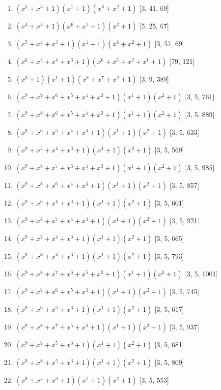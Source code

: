 \documentclass[10pt,twocolumn]{article}
\begin{document}
\begin{enumerate}
\item $(x^{5} + x^{3} + 1)(x^{1} + 1)(x^{6} + x^{2} + 1)$  [3, 41, 69]
\item $(x^{4} + x^{3} + 1)(x^{6} + x^{1} + 1)(x^{2} + 1)$  [5, 25, 67]
\item $(x^{5} + x^{4} + x^{3} + 1)(x^{1} + 1)(x^{6} + x^{2} + 1)$  [3, 57, 69]
\item $(x^{6} + x^{5} + x^{4} + x^{3} + 1)(x^{6} + x^{3} + x^{2} + x^{1} + 1)$  [79, 121]
\item $(x^{3} + 1)(x^{1} + 1)(x^{8} + x^{7} + x^{2} + 1)$  [3, 9, 389]
\item $(x^{9} + x^{7} + x^{6} + x^{5} + x^{4} + x^{3} + 1)(x^{1} + 1)(x^{2} + 1)$  [3, 5, 761]
\item $(x^{9} + x^{8} + x^{6} + x^{5} + x^{4} + x^{3} + 1)(x^{1} + 1)(x^{2} + 1)$  [3, 5, 889]
\item $(x^{9} + x^{6} + x^{5} + x^{4} + x^{3} + 1)(x^{1} + 1)(x^{2} + 1)$  [3, 5, 633]
\item $(x^{9} + x^{5} + x^{4} + x^{3} + 1)(x^{1} + 1)(x^{2} + 1)$  [3, 5, 569]
\item $(x^{9} + x^{8} + x^{7} + x^{6} + x^{4} + x^{3} + 1)(x^{1} + 1)(x^{2} + 1)$  [3, 5, 985]
\item $(x^{9} + x^{8} + x^{6} + x^{4} + x^{3} + 1)(x^{1} + 1)(x^{2} + 1)$  [3, 5, 857]
\item $(x^{9} + x^{6} + x^{4} + x^{3} + 1)(x^{1} + 1)(x^{2} + 1)$  [3, 5, 601]
\item $(x^{9} + x^{8} + x^{7} + x^{4} + x^{3} + 1)(x^{1} + 1)(x^{2} + 1)$  [3, 5, 921]
\item $(x^{9} + x^{7} + x^{4} + x^{3} + 1)(x^{1} + 1)(x^{2} + 1)$  [3, 5, 665]
\item $(x^{9} + x^{8} + x^{4} + x^{3} + 1)(x^{1} + 1)(x^{2} + 1)$  [3, 5, 793]
\item $(x^{9} + x^{8} + x^{7} + x^{6} + x^{5} + x^{3} + 1)(x^{1} + 1)(x^{2} + 1)$  [3, 5, 1001]
\item $(x^{9} + x^{7} + x^{6} + x^{5} + x^{3} + 1)(x^{1} + 1)(x^{2} + 1)$  [3, 5, 745]
\item $(x^{9} + x^{6} + x^{5} + x^{3} + 1)(x^{1} + 1)(x^{2} + 1)$  [3, 5, 617]
\item $(x^{9} + x^{8} + x^{7} + x^{5} + x^{3} + 1)(x^{1} + 1)(x^{2} + 1)$  [3, 5, 937]
\item $(x^{9} + x^{7} + x^{5} + x^{3} + 1)(x^{1} + 1)(x^{2} + 1)$  [3, 5, 681]
\item $(x^{9} + x^{8} + x^{5} + x^{3} + 1)(x^{1} + 1)(x^{2} + 1)$  [3, 5, 809]
\item $(x^{9} + x^{5} + x^{3} + 1)(x^{1} + 1)(x^{2} + 1)$  [3, 5, 553]

\end{enumerate}
\end{document}
